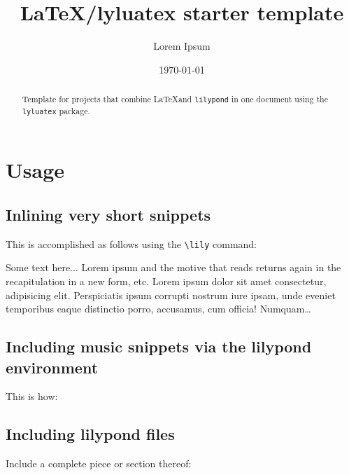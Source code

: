 \documentclass{article}
\title{LaTeX/lyluatex starter template}
\author{Lorem Ipsum}
\date{\today}
\begin{document}
\maketitle

\begin{abstract}
  Template for projects that combine \LaTeX and \verb|lilypond| in one document using the \verb|lyluatex| package.
\end{abstract}

\section{Usage}
\subsection{Inlining very short snippets}

This is accomplished as follows using the \verb|\lily| command:

Some text here... Lorem ipsum and the motive that reads  returns again in the recapitulation in a new form, etc. Lorem ipsum dolor sit amet consectetur, adipisicing elit. Perspiciatis ipsum corrupti nostrum iure ipsam, unde eveniet temporibus eaque distinctio porro, accusamus, cum officia! Numquam\dots


\subsection{Including music snippets via the lilypond environment}

This is how:
\vspace*{1em}

\begin{center}
\end{center}

\subsection{Including lilypond files}  

Include a complete piece or section thereof:

\end{document}
